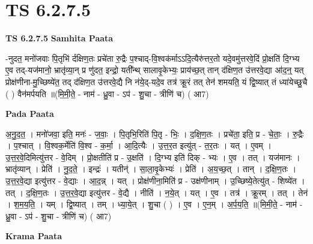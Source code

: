 \documentclass[17pt]{extarticle}
\begin{document}
\section{ TS 6.2.7.5 }

\textbf{TS 6.2.7.5 } \newline
\textbf{Samhita Paata} \newline

-नुदत॒ मनो॑जवाः पि॒तृभि॑ र्दक्षिण॒तः प्रचे॑ता रु॒द्रैः प॒श्चाद्-वि॒श्वक॑र्माऽऽदि॒त्यैरु॑त्तर॒तो यदे॒वमु॑त्तरवे॒दिं प्रो॒क्षति॑ दि॒ग्भ्य ए॒व तद्-यज॑मानो॒ भ्रातृ॑व्या॒न् प्र णु॑दत॒ इन्द्रो॒ यती᳚न्थ् सालावृ॒केभ्यः॒ प्राय॑च्छ॒त् तान् द॑क्षिण॒त उ॑त्तरवे॒द्या आ॑द॒न्॒ यत् प्रोक्ष॑णीना-मु॒च्छिष्ये॑त॒ तद् द॑क्षिण॒त उ॑त्तरवे॒द्यै नि न॑ये॒द्-यदे॒व तत्र॑ क्रू॒रं तत् तेन॑ शमयति॒ यं द्वि॒ष्यात् तं ध्या॑येच्छु॒चै ( ) वैन॑मर्पयति ॥(मि॒मी॒ते॒ - नाम॑ - ध्रु॒वा - ऽप॑ - शु॒चा - त्रीणि॑ च) ( आ7) \newline

\textbf{Pada Paata} \newline

अ॒नु॒द॒त॒ । मनो॑जवा॒ इति॒ मनः॑ - ज॒वाः॒ । पि॒तृभि॒रिति॑ पि॒तृ - भिः॒ । द॒क्षि॒ण॒तः । प्रचे॑ता॒ इति॒ प्र - चे॒ताः॒ । रु॒द्रैः । प॒श्चात् । वि॒श्वक॒र्मेति॑ वि॒श्व - क॒र्मा॒ । आ॒दि॒त्यैः । उ॒त्त॒र॒त इत्यु॑त् - त॒र॒तः । यत् । ए॒वम् । उ॒त्त॒र॒वे॒दिमित्यु॑त्तर - वे॒दिम् । प्रो॒क्षतीति॑ प्र - उ॒क्षति॑ । दि॒ग्भ्य इति॑ दिक् - भ्यः । ए॒व । तत् । यज॑मानः । भ्रातृ॑व्यान् । प्रेति॑ । नु॒द॒ते॒ । इन्द्रः॑ । यतीन्॑ । सा॒ला॒वृ॒केभ्यः॑ । प्रेति॑ । अ॒य॒च्छ॒त् । तान् । द॒क्षि॒ण॒तः । उ॒त्त॒र॒वे॒द्या इत्यु॑त्तर - वे॒द्याः । आ॒द॒न्न् । यत् । प्रोक्ष॑णीना॒मिति॑ प्र - उक्ष॑णीनाम् । उ॒च्छिष्ये॒तेत्यु॑त् - शिष्ये॑त । तत् । द॒क्षि॒ण॒तः । उ॒त्त॒र॒वे॒द्या इत्यु॑त्तर - वे॒द्यै । नीति॑ । न॒ये॒त् । यत् । ए॒व । तत्र॑ । क्रू॒रम् । तत् । तेन॑ । श॒म॒य॒ति॒ । यम् । द्वि॒ष्यात् । तम् । ध्या॒ये॒त् । शु॒चा ( ) । ए॒व । ए॒न॒म् । अ॒र्प॒य॒ति॒ ॥(मि॒मी॒ते॒ - नाम॑ - ध्रु॒वा - ऽप॑ - शु॒चा - त्रीणि॑ च) ( आ7)  \newline


\textbf{Krama Paata} \newline
\end{document}

